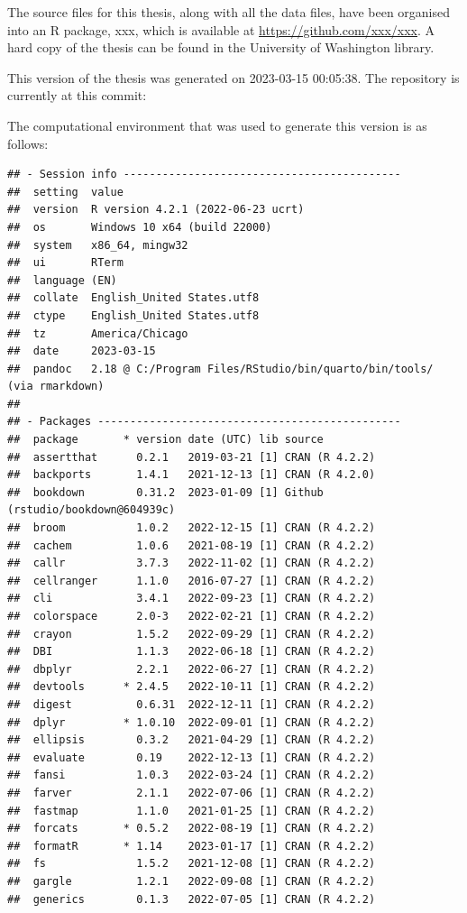 \documentclass[print]{nuthesis}
\begin{document}
The source files for this thesis, along with all the data files, have been organised into an R package, xxx, which is available at \url{https://github.com/xxx/xxx}. A hard copy of the thesis can be found in the University of Washington library.

This version of the thesis was generated on 2023-03-15 00:05:38. The repository is currently at this commit:

The computational environment that was used to generate this version is as follows:

\begin{verbatim}
## - Session info -------------------------------------------
##  setting  value
##  version  R version 4.2.1 (2022-06-23 ucrt)
##  os       Windows 10 x64 (build 22000)
##  system   x86_64, mingw32
##  ui       RTerm
##  language (EN)
##  collate  English_United States.utf8
##  ctype    English_United States.utf8
##  tz       America/Chicago
##  date     2023-03-15
##  pandoc   2.18 @ C:/Program Files/RStudio/bin/quarto/bin/tools/ (via rmarkdown)
## 
## - Packages -----------------------------------------------
##  package       * version date (UTC) lib source
##  assertthat      0.2.1   2019-03-21 [1] CRAN (R 4.2.2)
##  backports       1.4.1   2021-12-13 [1] CRAN (R 4.2.0)
##  bookdown        0.31.2  2023-01-09 [1] Github (rstudio/bookdown@604939c)
##  broom           1.0.2   2022-12-15 [1] CRAN (R 4.2.2)
##  cachem          1.0.6   2021-08-19 [1] CRAN (R 4.2.2)
##  callr           3.7.3   2022-11-02 [1] CRAN (R 4.2.2)
##  cellranger      1.1.0   2016-07-27 [1] CRAN (R 4.2.2)
##  cli             3.4.1   2022-09-23 [1] CRAN (R 4.2.2)
##  colorspace      2.0-3   2022-02-21 [1] CRAN (R 4.2.2)
##  crayon          1.5.2   2022-09-29 [1] CRAN (R 4.2.2)
##  DBI             1.1.3   2022-06-18 [1] CRAN (R 4.2.2)
##  dbplyr          2.2.1   2022-06-27 [1] CRAN (R 4.2.2)
##  devtools      * 2.4.5   2022-10-11 [1] CRAN (R 4.2.2)
##  digest          0.6.31  2022-12-11 [1] CRAN (R 4.2.2)
##  dplyr         * 1.0.10  2022-09-01 [1] CRAN (R 4.2.2)
##  ellipsis        0.3.2   2021-04-29 [1] CRAN (R 4.2.2)
##  evaluate        0.19    2022-12-13 [1] CRAN (R 4.2.2)
##  fansi           1.0.3   2022-03-24 [1] CRAN (R 4.2.2)
##  farver          2.1.1   2022-07-06 [1] CRAN (R 4.2.2)
##  fastmap         1.1.0   2021-01-25 [1] CRAN (R 4.2.2)
##  forcats       * 0.5.2   2022-08-19 [1] CRAN (R 4.2.2)
##  formatR       * 1.14    2023-01-17 [1] CRAN (R 4.2.2)
##  fs              1.5.2   2021-12-08 [1] CRAN (R 4.2.2)
##  gargle          1.2.1   2022-09-08 [1] CRAN (R 4.2.2)
##  generics        0.1.3   2022-07-05 [1] CRAN (R 4.2.2)

\end{verbatim}
\end{document}
